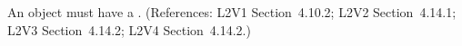 An \Event object must have a .  (References: L2V1
Section~4.10.2; L2V2 Section~4.14.1; L2V3
Section~4.14.2; L2V4 Section~4.14.2.)
